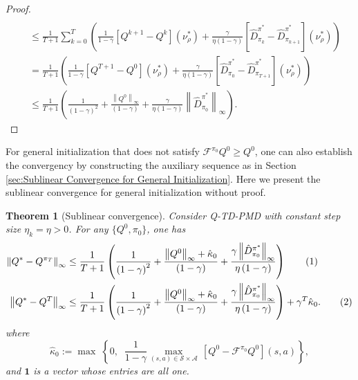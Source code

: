 \documentclass[10pt]{article}
\newcommand{\calA}{\mathcal{A}}
\newcommand{\calS}{\mathcal{S}}
\newcommand{\calF}{\mathcal{F}}
\newcommand{\ls}{\left}
\newcommand{\rs}{\right}
\newcommand\numberthis{\addtocounter{equation}{1}\tag{\theequation}}
\theoremstyle{plain}
\newtheorem{theorem}{Theorem}[section]
\theoremstyle{definition}
\begin{document}
\begin{proof}
\begin{align*}
\\
\,\,                   &\le \frac{1}{T+1}\sum_{k=0}^T{\left( \frac{1}{1-\gamma}\left[ Q^{k+1}-Q^k \right] \left( \nu _{\rho}^{*} \right) +\frac{\gamma}{\eta(1-\gamma)}\left[ \hat{D}_{\pi _k}^{\pi ^*}-\hat{D}_{\pi _{k+1}}^{\pi ^*} \right] \left( \nu _{\rho}^{*} \right) \right)}
\\
\,\,                    &=\frac{1}{T+1}\left( \frac{1}{1-\gamma}\left[ Q^{T+1}-Q^0 \right] \left( \nu _{\rho}^{*} \right) +\frac{\gamma}{\eta(1-\gamma)}\left[ \hat{D}_{\pi _0}^{\pi ^*}-\hat{D}_{\pi _{T+1}}^{\pi ^*} \right] \left( \nu _{\rho}^{*} \right) \right) 
\\
\,\,                    &\leq \frac{1}{T+1}\left( \frac{1}{\left( 1-\gamma \right) ^2}+\frac{\left\| Q^0 \right\| _{\infty}}{\left( 1-\gamma \right)}+\frac{\gamma}{\eta(1-\gamma)}\left\| \hat{D}_{\pi _0}^{\pi ^*} \right\| _{\infty} \right).
\end{align*}
\end{proof}
For general initialization that does not satisfy $\calF^{\pi_0} Q^0 \geq Q^0$, one can also establish the convergency by constructing the auxiliary sequence  as in  Section \ref{sec:Sublinear Convergence for General Initialization}. Here we present the sublinear convergence for general initialization without proof.

\begin{theorem}[Sublinear convergence]\label{thm:sublinear-convergence-of-exact-Q-TD-PMD-formal}
  Consider Q-TD-PMD with constant step size $\eta_k=\eta>0$. For any $\{Q^0,\pi_0\}$, one has
    \begin{align*}
\left\| Q^*-Q^{\pi _T} \right\| _{\infty}&\le \frac{1}{T+1}\left( \frac{1}{\left( 1-\gamma \right) ^2}+\frac{\left\| Q^0 \right\| _{\infty}+\hat{\kappa}_0}{\left( 1-\gamma \right)}+\frac{\gamma \left\| \hat{D}_{\pi _0}^{\pi ^*} \right\| _{\infty}}{\eta \left( 1-\gamma \right)} \right)  \numberthis\label{eq:sublinear-convergence-of-output-policy-Q-TD-PMD} 
        \\
\left\| Q^*-Q^T \right\| _{\infty}&\le \frac{1}{T+1}\left( \frac{1}{\left( 1-\gamma \right) ^2}+\frac{\left\| Q^0 \right\| _{\infty}+\hat{\kappa}_0}{\left( 1-\gamma \right)}+\frac{\gamma \left\| \hat{D}_{\pi _0}^{\pi ^*} \right\| _{\infty}}{\eta \left( 1-\gamma \right)} \right) +\gamma ^T\hat{\kappa}_0.
        \numberthis \label{eq:sublinear-convergence-of-output-value-Q-TD-PMD}
    \end{align*}
where 
\[\hat{\kappa}_0 :=  \max \; \ls\{0, \;\; \frac{1}{1-\gamma} \max_{(s,a)\in\calS\times\calA} \, [Q^0 - \calF^{\pi_0}Q^0](s,a) \rs\} , \]
and $\mathbf{1}$ is a vector whose entries are all one.
\end{theorem}
\end{document}
